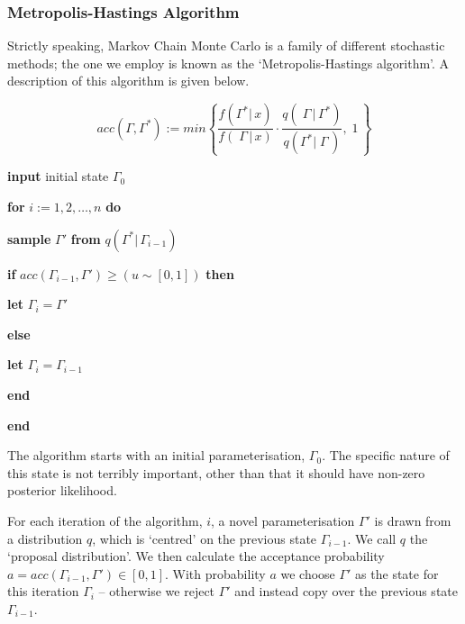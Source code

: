 \documentclass[10pt,journal,compsoc]{IEEEtran}
\begin{document}
\subsubsection{Metropolis-Hastings Algorithm}

Strictly speaking, Markov Chain Monte Carlo is a family of different stochastic methods; the one we employ is known as the `Metropolis-Hastings algorithm'. A description of this algorithm is given below.

\begin{equation*}
acc(\Gamma, \Gamma^*) := min\left\{\frac{f(\Gamma^*|\,x)}{f(\;\Gamma\,|\,x)} \cdot \frac{q(\;\Gamma\,|\,\Gamma^*)}{q(\Gamma^*|\;\Gamma\,)},\;1\,\right\}
\end{equation*}

\indent\textbf{input} initial state $\Gamma_0$

\indent\textbf{for} $i := 1, 2, \ldots , n$ \textbf{do}



\indent\indent\textbf{sample} $\Gamma'$ \textbf{from} $q(\Gamma^*|\,\Gamma_{i-1})$

\indent\indent\textbf{if} $acc(\Gamma_{i-1}, \Gamma') \ge (u \sim [0, 1])$ \textbf{then}

\indent\indent\indent\textbf{let} $\Gamma_i = \Gamma'$

\indent\indent\textbf{else}

\indent\indent\indent\textbf{let} $\Gamma_i = \Gamma_{i-1}$

\indent\indent\textbf{end}

\indent\textbf{end}

\vspace{0.5cm}

The algorithm starts with an initial parameterisation, $\Gamma_0$. The specific nature of this state is not terribly important, other than that it should have non-zero posterior likelihood.

For each iteration of the algorithm, $i$, a novel parameterisation $\Gamma'$ is drawn from a distribution $q$, which is `centred' on the previous state $\Gamma_{i-1}$. We call $q$ the `proposal distribution'. We then calculate the acceptance probability $a = acc(\Gamma_{i-1}, \Gamma') \in [0, 1]$. With probability $a$ we choose $\Gamma'$ as the state for this iteration $\Gamma_i$ -- otherwise we reject $\Gamma'$ and instead copy over the previous state $\Gamma_{i-1}$.
\end{document}
